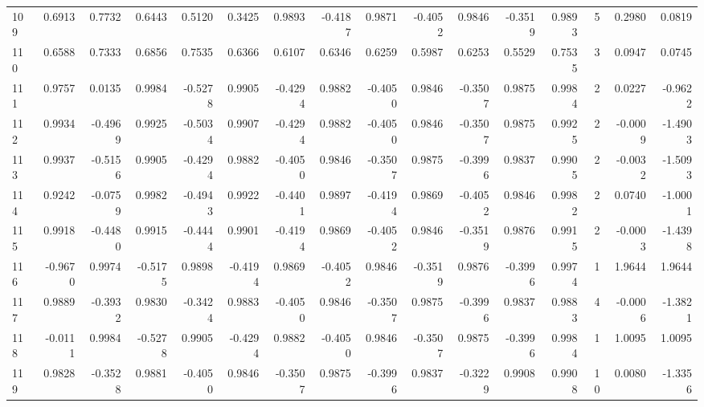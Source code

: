 \begin{tabular}{lrrrrrrrrrrrrrrr}
109 &      0.6913 &  0.7732 &  0.6443 &  0.5120 &  0.3425 &  0.9893 & -0.4187 &  0.9871 & -0.4052 &  0.9846 &  -0.3519 &     0.9893 &      5 &                    0.2980 &                     0.0819 \\
110 &      0.6588 &  0.7333 &  0.6856 &  0.7535 &  0.6366 &  0.6107 &  0.6346 &  0.6259 &  0.5987 &  0.6253 &   0.5529 &     0.7535 &      3 &                    0.0947 &                     0.0745 \\
111 &      0.9757 &  0.0135 &  0.9984 & -0.5278 &  0.9905 & -0.4294 &  0.9882 & -0.4050 &  0.9846 & -0.3507 &   0.9875 &     0.9984 &      2 &                    0.0227 &                    -0.9622 \\
112 &      0.9934 & -0.4969 &  0.9925 & -0.5034 &  0.9907 & -0.4294 &  0.9882 & -0.4050 &  0.9846 & -0.3507 &   0.9875 &     0.9925 &      2 &                   -0.0009 &                    -1.4903 \\
113 &      0.9937 & -0.5156 &  0.9905 & -0.4294 &  0.9882 & -0.4050 &  0.9846 & -0.3507 &  0.9875 & -0.3996 &   0.9837 &     0.9905 &      2 &                   -0.0032 &                    -1.5093 \\
114 &      0.9242 & -0.0759 &  0.9982 & -0.4943 &  0.9922 & -0.4401 &  0.9897 & -0.4194 &  0.9869 & -0.4052 &   0.9846 &     0.9982 &      2 &                    0.0740 &                    -1.0001 \\
115 &      0.9918 & -0.4480 &  0.9915 & -0.4444 &  0.9901 & -0.4194 &  0.9869 & -0.4052 &  0.9846 & -0.3519 &   0.9876 &     0.9915 &      2 &                   -0.0003 &                    -1.4398 \\
116 &     -0.9670 &  0.9974 & -0.5175 &  0.9898 & -0.4194 &  0.9869 & -0.4052 &  0.9846 & -0.3519 &  0.9876 &  -0.3996 &     0.9974 &      1 &                    1.9644 &                     1.9644 \\
117 &      0.9889 & -0.3932 &  0.9830 & -0.3424 &  0.9883 & -0.4050 &  0.9846 & -0.3507 &  0.9875 & -0.3996 &   0.9837 &     0.9883 &      4 &                   -0.0006 &                    -1.3821 \\
118 &     -0.0111 &  0.9984 & -0.5278 &  0.9905 & -0.4294 &  0.9882 & -0.4050 &  0.9846 & -0.3507 &  0.9875 &  -0.3996 &     0.9984 &      1 &                    1.0095 &                     1.0095 \\
119 &      0.9828 & -0.3528 &  0.9881 & -0.4050 &  0.9846 & -0.3507 &  0.9875 & -0.3996 &  0.9837 & -0.3229 &   0.9908 &     0.9908 &     10 &                    0.0080 &                    -1.3356 \\

\end{tabular}
